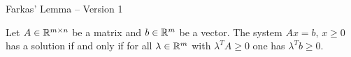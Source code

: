 \begin{frame}{}

  \begin{columns}
    \begin{column}{.5\textwidth}
      
    \end{column}
    \begin{column}{.5\textwidth}
      
    \end{column}       
  \end{columns}
\end{frame}






\begin{frame}{Farkas' Lemma -- Version 1}



\begin{theorem}
  \label{conv:thr:12}
  Let $A \in \mathbb{R}^{m\times n}$ be a matrix and $b \in \mathbb{R}^m$ be a vector. The
  system $Ax = b, \,x\geq0$ has a solution if and only if for all $\lambda \in
  \mathbb{R}^m$ with $\lambda^TA\geq0$ one has $\lambda^Tb \geq0$.  
\end{theorem}
  
  \begin{columns}
    \begin{column}{.5\textwidth}
      
    \end{column}
    \begin{column}{.5\textwidth}
      
    \end{column}       
  \end{columns}
\end{frame}





\begin{frame}{}

  \begin{columns}
    \begin{column}{.5\textwidth}
      
    \end{column}
    \begin{column}{.5\textwidth}
       
    \end{column}       
  \end{columns}
\end{frame}






